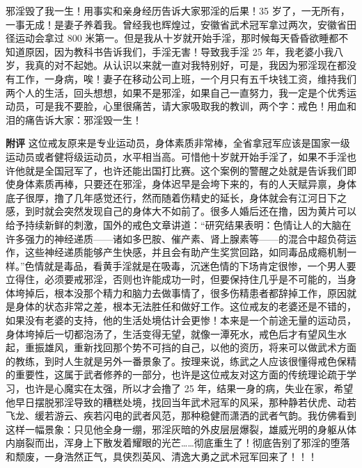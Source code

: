 \begin{case}
    邪淫毁了我一生！用事实和亲身经历告诉大家邪淫的后果！35 岁了，一无所有，一事无成！是妻子养着我。曾经我也辉煌过，安徽省武术冠军拿过两次，安徽省田径运动会拿过 800 米第一。但是我从十岁就开始手淫，那时候每天昏昏欲睡都不知道原因，因为教科书告诉我们，手淫无害！导致我手淫 25 年，我老婆小我八岁，我真的对不起她。从认识以来就一直对我特别好，可是，我因为邪淫现在都没有工作，一身病，唉！妻子在移动公司上班，一个月只有五千块钱工资，维持我们两个人的生活，回头想想，如果不是邪淫，如果自己一直努力，我一定是个优秀运动员，可是我不要脸，心里很痛苦，请大家吸取我的教训，两个字：戒色！用血和泪的痛告诉大家：邪淫毁一生！

    \textbf{附评} 这位戒友原来是专业运动员，身体素质非常棒，全省拿冠军应该是国家一级运动员或者健将级运动员，水平相当高。可惜他十岁就开始手淫了，如果不手淫也许他就是全国冠军了，也许还能出国打比赛。这个案例的警醒之处就是告诉我们即使身体素质再棒，只要还在邪淫，身体迟早是会垮下来的，有的人天赋异禀，身体底子很厚，撸了几年感觉还行，然而随着伤精史的延长，身体就会有江河日下之感，到时就会突然发现自己的身体大不如前了。很多人婚后还在撸，因为黄片可以给予持续新鲜的刺激，国外的戒色文章讲道：“研究结果表明：色情让人的大脑在许多强力的神经递质——诸如多巴胺、催产素、肾上腺素等——的混合中超负荷运作，这些神经递质能够产生快感，并且会有助产生奖赏回路，如同毒品成瘾机制一样。”色情就是毒品，看黄手淫就是在吸毒，沉迷色情的下场肯定很惨，一个男人要立得住，必须要戒邪淫，否则也许能成功一时，但要保持住几乎是不可能的，当身体垮掉后，根本没那个精力和脑力去做事情了，很多伤精患者都辞掉工作，原因就是身体的状态非常之差，根本无法胜任和做好工作。这位戒友的老婆还是不错的，如果没有老婆的支持，他的生活处境估计会更惨！本来是一个前途无量的运动员，身体垮掉后一切都泡汤了，生活变得无望，就像一潭死水，戒色后才有望风生水起，重振雄风，重新找回那个势不可挡的自己，以他的资历，将来可以做武术方面的教练，到时人生就是另外一番景象了。按理来说，练武之人应该很懂得戒色保精的重要性，这属于武者修养的一部分，也许是这位戒友对这方面的传统理论疏于学习，也许是心魔实在太强，所以才会撸了 25 年，结果一身的病，失业在家，希望他早日摆脱邪淫导致的糟糕处境，找回当年武术冠军的风采，那种静若伏虎、动若飞龙、缓若游云、疾若闪电的武者风范，那种稳健而潇洒的武者气韵。我仿佛看到这样一幅景象：只见他全身一绷，邪淫灰暗的外皮层层爆裂，雄威光明的身躯从体内崩裂而出，浑身上下散发着耀眼的光芒……彻底重生了！彻底告别了邪淫的堕落和颓废，一身浩然正气，具侠烈英风、清逸大勇之武术冠军回来了！！！
\end{case}

